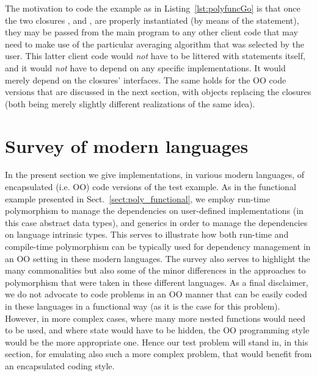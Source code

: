 \documentclass[11pt,oneside]{article}
\newcommand{\code}[1]{{\selectfont\ttfamily{#1}}}
\begin{document}


The motivation to code the example as in Listing~\ref{lst:polyfuncGo}
is that once the two closures \code{avi}, and \code{avf}, are properly
instantiated (by means of the \code{switch} statement), they may be
passed from the main program to any other client code that may need to
make use of the particular averaging algorithm that was selected by
the user. This latter client code would \emph{not} have to be littered
with \code{switch} statements itself, and it would \emph{not} have to
depend on any specific implementations. It would merely depend on the
closures' interfaces. The same holds for the OO code versions that are
discussed in the next section, with objects replacing the closures
(both being merely slightly different realizations of the same idea).

\section{Survey of modern languages}
\label{sect:survey}

In the present section we give implementations, in various modern
languages, of encapsulated (i.e. OO) code versions of the test
example. As in the functional example presented in
Sect.~\ref{sect:poly_functional}, we employ run-time polymorphism to
manage the dependencies on user-defined implementations (in this case
abstract data types), and generics in order to manage the dependencies
on language intrinsic types. This serves to illustrate how both
run-time and compile-time polymorphism can be typically used for
dependency management in an OO setting in these modern languages. The
survey also serves to highlight the many commonalities but also some
of the minor differences in the approaches to polymorphism that were
taken in these different languages. As a final disclaimer, we do not
advocate to code problems in an OO manner that can be easily coded in
these languages in a functional way (as it is the case for this
problem). However, in more complex cases, where many more nested
functions would need to be used, and where state would have to be
hidden, the OO programming style would be the more appropriate
one. Hence our test problem will stand in, in this section, for
emulating also such a more complex problem, that would benefit from an
encapsulated coding style.
\end{document}
